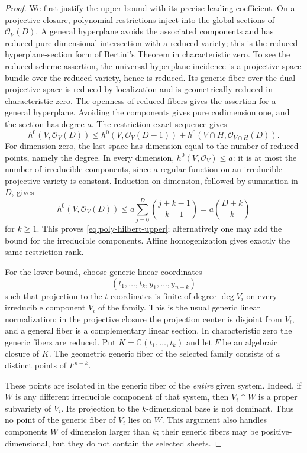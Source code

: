 \begin{proof}
We first justify the upper bound with its precise leading coefficient. On a projective closure, polynomial restrictions inject into the global sections of $\mathcal{O}_V(D)$.  A general hyperplane avoids the associated components and has reduced pure-dimensional intersection with a reduced variety; this is the reduced hyperplane-section form of Bertini's Theorem in characteristic zero.  To see the reduced-scheme assertion, the universal hyperplane incidence is a projective-space bundle over the reduced variety, hence is reduced.  Its generic fiber over the dual projective space is reduced by localization and is geometrically reduced in characteristic zero.  The openness of reduced fibers \cite[Tag~0578]{stacksproject} gives the assertion for a general hyperplane.  Avoiding the components gives pure codimension one, and the section has degree $a$.  The restriction exact sequence gives
\[
 h^0(V,\mathcal{O}_V(D))\le
 h^0(V,\mathcal{O}_V(D-1))+
 h^0(V\cap H,\mathcal{O}_{V\cap H}(D)).
\]
For dimension zero, the last space has dimension equal to the number of reduced points, namely the degree.  In every dimension, $h^0(V,\mathcal{O}_V)\le a$: it is at most the number of irreducible components, since a regular function on an irreducible projective variety is constant.  Induction on dimension, followed by summation in $D$, gives
\[
 h^0(V,\mathcal{O}_V(D))
 \le a\sum_{j=0}^D\binom{j+k-1}{k-1}
 =a\binom{D+k}{k}
\]
for $k\ge1$.  This proves \eqref{eq:poly-hilbert-upper}; alternatively one may add the bound for the irreducible components.  Affine homogenization gives exactly the same restriction rank.

For the lower bound, choose generic linear coordinates
\[
 (t_1,\ldots,t_k,y_1,\ldots,y_{n-k})
\]
such that projection to the $t$ coordinates is finite of degree $\deg V_i$ on every irreducible component $V_i$ of the family.  This is the usual generic linear normalization: in the projective closure the projection center is disjoint from $V_i$, and a general fiber is a complementary linear section.  In characteristic zero the generic fibers are reduced.  Put $K=\mathbb{C}(t_1,\ldots,t_k)$ and let $F$ be an algebraic closure of $K$.  The geometric generic fiber of the selected family consists of $a$ distinct points of $F^{n-k}$.

These points are isolated in the generic fiber of the \emph{entire} given system.  Indeed, if $W$ is any different irreducible component of that system, then $V_i\cap W$ is a proper subvariety of $V_i$. Its projection to the $k$-dimensional base is not dominant.  Thus no point of the generic fiber of $V_i$ lies on $W$.  This argument also handles components $W$ of dimension larger than $k$; their generic fibers may be positive-dimensional, but they do not contain the selected sheets.


\end{proof}
